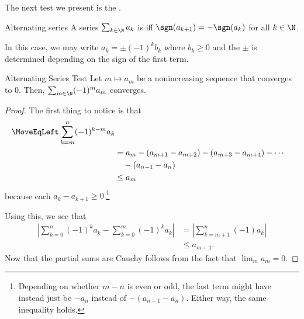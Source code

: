 The next test we present is the .
\begin{dfn}{Alternating series}{}
A series $\sum _{k\in \N}a_k$ is  iff $\sgn (a_{k+1})=-\sgn (a_k)$ for all $k\in \N$.
\begin{rmk}
In this case, we may write $a_k=\pm (-1)^kb_k$ where $b_k\geq 0$ and the $\pm$ is determined depending on the sign of the first term.
\end{rmk}
\end{dfn}
\begin{prp}{Alternating Series Test}{}
Let $m\mapsto a_m$ be a nonincreasing sequence that converges to $0$.  Then, $\sum _{m\in \N}(-1)^ma_m$ converges.
\begin{proof}
The first thing to notice is that
\begin{equation}
\begin{split}
\MoveEqLeft
\sum _{k=m}^n(-1)^{k-m}a_k \\
& =a_m-(a_{m+1}-a_{m+2})-(a_{m+3}-a_{m+4})-\cdots \\ & \quad -(a_{n-1}-a_n) \\
& \leq a_m
\end{split}
\end{equation}
because each $a_k-a_{k+1}\geq 0$.\footnote{Depending on whether $m-n$ is even or odd, the last term might have instead just be $-a_n$ instead of $-(a_{n-1}-a_n)$.  Either way, the same inequality holds.}

Using this, we see that
\begin{equation}
\begin{split}
\left| \sum _{k=0}^n(-1)^ka_k-\sum _{k=0}^m(-1)^ka_k\right| & =\left| \sum _{k=m+1}^n(-1)a_k\right| \\
& \leq a_{m+1}.
\end{split}
\end{equation}
Now that the partial sums are Cauchy follows from the fact that $\lim _ma_m=0$.
\end{proof}
\end{prp}
